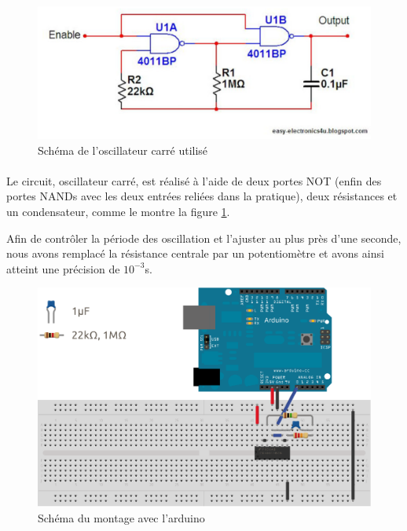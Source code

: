 \documentclass{article}
\begin{document}
\begin{figure}[h]
\centering
\includegraphics{oscillator.jpg.eps}
\caption{\label{schema} Schéma de l'oscillateur carré utilisé}
\end{figure}
\paragraph{}Le circuit, oscillateur carré, est réalisé à l'aide de deux portes NOT (enfin des portes NANDs avec les deux entrées reliées dans la pratique), deux résistances et un condensateur, comme le montre la figure \ref{schema}.

Afin de contrôler la période des oscillation et l'ajuster au plus près d'une seconde, nous avons remplacé la résistance centrale par un potentiomètre et avons ainsi atteint une précision de $10^{-3}$s.


\begin{figure}[h]
\centering
\includegraphics{sysdig_clock.eps}
\caption{\label{arduino_schema} Schéma du montage avec l'arduino}
\end{figure}
\end{document}
